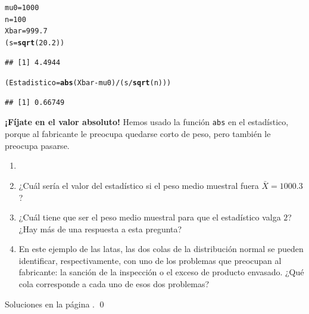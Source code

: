\documentclass[10pt,a4paper]{article}\usepackage[]{graphicx}\usepackage[]{color}
\makeatletter
\newcommand{\hlnum}[1]{\textcolor[rgb]{0.686,0.059,0.569}{#1}}%
\newcommand{\hlopt}[1]{\textcolor[rgb]{0,0,0}{#1}}%
\newcommand{\hlstd}[1]{\textcolor[rgb]{0.345,0.345,0.345}{#1}}%
\newcommand{\hlkwb}[1]{\textcolor[rgb]{0.69,0.353,0.396}{#1}}%
\newcommand{\hlkwd}[1]{\textcolor[rgb]{0.737,0.353,0.396}{\textbf{#1}}}%
\newenvironment{kframe}{%
 \def\at@end@of@kframe{}%
 \ifinner\ifhmode%
  \def\at@end@of@kframe{\end{minipage}}%
  \begin{minipage}{\columnwidth}%
 \fi\fi%
 \def\FrameCommand##1{\hskip\@totalleftmargin \hskip-\fboxsep
 \colorbox{shadecolor}{##1}\hskip-\fboxsep
     \hskip-\linewidth \hskip-\@totalleftmargin \hskip\columnwidth}%
 \MakeFramed {\advance\hsize-\width
   \@totalleftmargin\z@ \linewidth\hsize
   \@setminipage}}%
 {\par\unskip\endMakeFramed%
 \at@end@of@kframe}
\newenvironment{knitrout}{}{} %
\newcounter {cont01}
\makeatother
\begin{document}
\begin{knitrout}
\color{fgcolor}\begin{kframe}
\begin{alltt}
\hlstd{mu0} \hlkwb{=} \hlnum{1000}
\hlstd{n} \hlkwb{=} \hlnum{100}
\hlstd{Xbar} \hlkwb{=} \hlnum{999.7}
\hlstd{(s} \hlkwb{=} \hlkwd{sqrt}\hlstd{(}\hlnum{20.2}\hlstd{))}
\end{alltt}
\begin{verbatim}
## [1] 4.4944
\end{verbatim}
\begin{alltt}
\hlstd{(Estadistico} \hlkwb{=} \hlkwd{abs}\hlstd{(Xbar} \hlopt{-} \hlstd{mu0)} \hlopt{/} \hlstd{(s} \hlopt{/} \hlkwd{sqrt}\hlstd{(n)))}
\end{alltt}
\begin{verbatim}
## [1] 0.66749
\end{verbatim}
\end{kframe}
\end{knitrout}
{\bf ¡Fíjate en el valor absoluto!} Hemos usado la función {\tt abs} en el estadístico, porque al fabricante le preocupa quedarse corto de peso, pero también le preocupa pasarse.

\begin{ejercicio}
\label{tut07:ejercicio06}
\begin{enumerate}
  \item[]
  \item ¿Cuál sería el valor del estadístico si el peso medio muestral fuera $\bar X= 1000.3$?
  \item ¿Cuál tiene que ser el peso medio muestral para que el estadístico valga $2$? ¿Hay más de una respuesta a esta pregunta?
  \item En este ejemplo de las latas, las dos colas de la distribución normal se pueden identificar, respectivamente, con uno de los problemas que preocupan al fabricante: la sanción de la inspección o el exceso de producto envasado. ¿Qué cola corresponde a cada uno de esos dos problemas?
\end{enumerate}
Soluciones en la página \pageref{tut07:ejercicio06:sol}.
\qed
\end{ejercicio}
\end{document}
